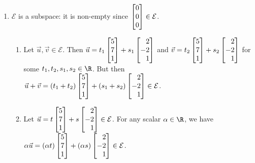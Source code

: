 \begin{exercises}
\begin{problist}
\begin{solution}
\begin{enumerate}
				\item $\mathcal E$ is a subspace: it is non-empty since $\mat{0\\0\\0}\in\mathcal E$. 
				\begin{enumerate}
					\item Let $\vec u,\vec v\in \mathcal E$. Then $\vec u=t_1\mat{5\\7\\1}+s_1\mat{2\\-2\\1}$ 
						and $\vec v=t_2\mat{5\\7\\1}+s_2\mat{2\\-2\\1}$ for some $t_1,t_2,s_1,s_2\in\R$. 
						But then $\vec u+\vec v=(t_1+t_2)\mat{5\\7\\1}+(s_1+s_2)\mat{2\\-2\\1}\in \mathcal E$.
					\item Let $\vec u=t\mat{5\\7\\1}+s\mat{2\\-2\\1}\in\mathcal E$. For any scalar $\alpha\in\R$,
						we have $\alpha\vec u=(\alpha t)\mat{5\\7\\1}+(\alpha s)\mat{2\\-2\\1}\in\mathcal E$.
				\end{enumerate}
			\end{enumerate}

		\end{solution}		


\end{problist}
\end{exercises}
